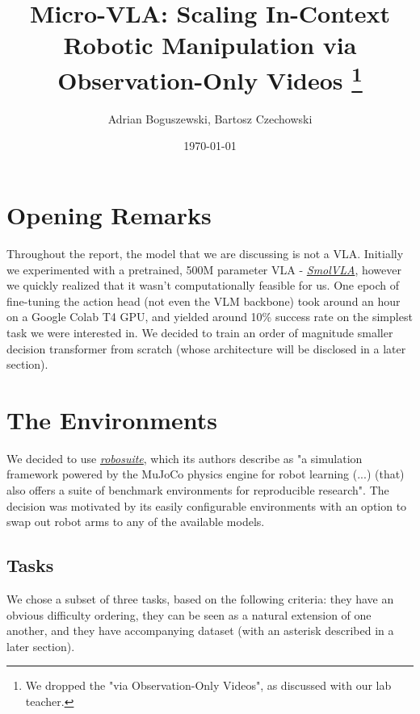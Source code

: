 \documentclass{article}
\title{Micro-VLA: Scaling In-Context Robotic Manipulation via Observation-Only Videos \footnote{We dropped the "via Observation-Only Videos", as discussed with our lab teacher.}}
\author{Adrian Boguszewski, Bartosz Czechowski}
\date{\today}
\begin{document}
\maketitle

\section*{Opening Remarks}
Throughout the report, the model that we are discussing is not a VLA.
Initially we experimented with a pretrained, 500M parameter VLA - \href{https://huggingface.co/lerobot/smolvla\_base}{\textit{SmolVLA}}, however we quickly realized that it wasn't computationally feasible for us.
One epoch of fine-tuning the action head (not even the VLM backbone) took around an hour on a Google Colab T4 GPU, and yielded around 10\% success rate on the simplest task we were interested in.
We decided to train an order of magnitude smaller decision transformer from scratch (whose architecture will be disclosed in a later section).

\section{The Environments}
We decided to use \href{https://robosuite.ai/}{\textit{robosuite}}, which its authors describe as "a simulation framework powered by the MuJoCo physics engine for robot learning (...) (that) also offers a suite of benchmark environments for reproducible research".
The decision was motivated by its easily configurable environments with an option to swap out robot arms to any of the available models.

\subsection{Tasks}
We chose a subset of three tasks, based on the following criteria: they have an obvious difficulty ordering, they can be seen as a natural extension of one another, and they have accompanying dataset (with an asterisk described in a later section).
\end{document}
